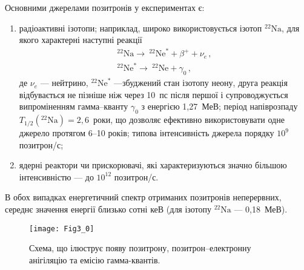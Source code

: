 Основними джерелами позитронів у експериментах є:
\begin{enumerate}[label=\asbuk*),leftmargin=0em,itemindent=1.5em]
  \item радіоактивні ізотопи;
  наприклад,  широко використовується ізотоп $^{22}\text{Na}$, для якого характерні наступні реакції
  \begin{gather*}
  ^{22}\text{Na}\rightarrow \:^{22}\text{Ne}^{*}+\beta^++\nu_e\,,\\
  ^{22}\text{Ne}^{*}\rightarrow \:^{22}\text{Ne}+\gamma_{0}\,,
  \end{gather*}
де
$\nu_e$ --- нейтрино,
$^{22}\text{Ne}^{*}$ ---збуджений стан ізотопу неону,
друга реакція відбувається не пізніше ніж через 10~пс після першої і супроводжується
випроміненням гамма--кванту $\gamma_0$ з енергією 1,27~МеВ;
період напіврозпаду $T_{1/2}(^{22}\text{Na})=2,6$~роки, що
дозволяє ефективно використовувати одне джерело протягом 6--10 років;
 типова інтенсивність джерела порядку $10^9$ позитрон/с;
  \item ядерні реактори чи прискорювачі, які характеризуються значно більшою інтенсивністю --- до $10^{12}$ позитрон/с.
\end{enumerate}
В обох випадках енергетичний спектр отриманих позитронів неперервних,
середнє значення енергії близько сотні кеВ (для ізотопу $^{22}\text{Na}$ --- 0,18~МеВ).

\begin{figure}[t]
\center
\vspace{-5mm}
\texttt{[image: Fig3\_0]}
\vspace{-3mm}
\caption{Схема, що ілюструє появу позитрону, позитрон--електронну анігіляцію
та емісію гамма-квантів.}
\vspace{-3mm}
\label{F30}
\end{figure}

